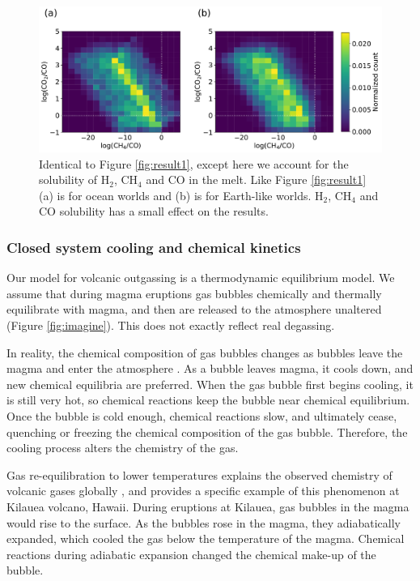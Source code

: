 \begin{figure}
    \centering
    \includegraphics[width=\textwidth]{tex/3methane/figures/both_CO_H2_CH4_solu.pdf}
    \caption{Identical to Figure \ref{fig:result1}, except here we account for the solubility of H$_2$, CH$_4$ and CO in the melt. Like Figure \ref{fig:result1} (a) is for ocean worlds and (b) is for Earth-like worlds. H$_2$, CH$_4$ and CO  solubility has a small effect on the results.}
    \label{fig:Ch4COH2solu}
\end{figure}

\subsubsection{Closed system cooling and chemical kinetics}\label{sec:kinetics}

Our model for volcanic outgassing is a thermodynamic equilibrium model. We assume that during magma eruptions gas bubbles chemically and thermally equilibrate with magma, and then are released to the atmosphere unaltered (Figure \ref{fig:imagine}). This does not exactly reflect real degassing. 

In reality, the chemical composition of gas bubbles changes as bubbles leave the magma and enter the atmosphere \citep{Moussallam_2019, Kadoya_2020}. As a bubble leaves magma, it cools down, and new chemical equilibria are preferred. When the gas bubble first begins cooling, it is still very hot, so chemical reactions keep the bubble near chemical equilibrium. Once the bubble is cold enough, chemical reactions slow, and ultimately cease, quenching or freezing the chemical composition of the gas bubble. Therefore, the cooling process alters the chemistry of the gas. 

Gas re-equilibration to lower temperatures explains the observed chemistry of volcanic gases globally \citep{Moussallam_2019}, and \citet{Oppenheimer_2018} provides a specific example of this phenomenon at Kilauea volcano, Hawaii. During eruptions at Kilauea, gas bubbles in the magma would rise to the surface. As the bubbles rose in the magma, they adiabatically expanded, which cooled the gas below the temperature of the magma. Chemical reactions during adiabatic expansion changed the chemical make-up of the bubble.

